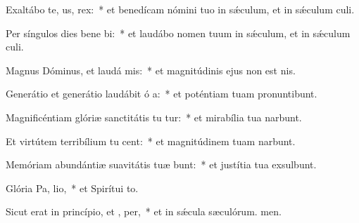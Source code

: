\item Exaltábo te,  us, rex:~* et benedícam nómini tuo in sǽculum, et in sǽculum culi.
\item Per síngulos dies bene bi:~* et laudábo nomen tuum in sǽculum, et in sǽculum culi.
\item Magnus Dóminus, et laudá mis:~* et magnitúdinis ejus non est nis.
\item Generátio et generátio laudábit ó a:~* et poténtiam tuam pronuntibunt.
\item Magnificéntiam glóriæ sanctitátis tu tur:~* et mirabília tua narbunt.
\item Et virtútem terribílium tu cent:~* et magnitúdinem tuam narbunt.
\item Memóriam abundántiæ suavitátis tuæ bunt:~* et justítia tua exsulbunt.
\item Glória Pa,  lio,~* et Spirítui to.
\item Sicut erat in princípio, et ,  per,~* et in sǽcula sæculórum. men.
